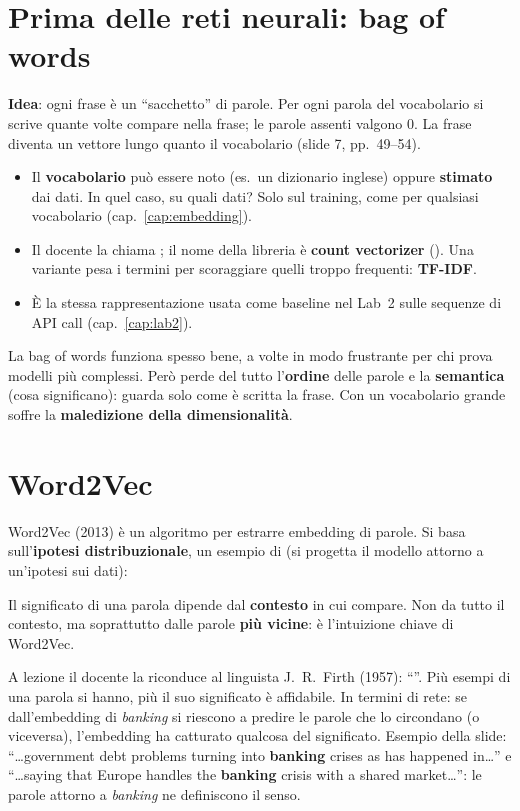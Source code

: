 \section{Prima delle reti neurali: bag of words}
\textbf{Idea}: ogni frase è un ``sacchetto'' di parole. Per ogni parola del vocabolario si scrive quante volte compare nella frase;
le parole assenti valgono 0. La frase diventa un vettore lungo quanto il vocabolario (slide 7, pp.~49--54).
\begin{itemize}
  \item Il \textbf{vocabolario} può essere noto (es.\ un dizionario inglese) oppure \textbf{stimato} dai dati. In quel caso, su quali
        dati? Solo sul training, come per qualsiasi vocabolario (cap.~\ref{cap:embedding}).
  \item Il docente la chiama ; il nome della libreria è \textbf{count vectorizer}
        (). Una variante pesa i termini per scoraggiare quelli troppo frequenti: \textbf{TF-IDF}.
  \item È la stessa rappresentazione usata come baseline nel Lab~2 sulle sequenze di API call (cap.~\ref{cap:lab2}).
\end{itemize}
\begin{attenzione}
La bag of words funziona spesso bene, a volte in modo frustrante per chi prova modelli più complessi. Però perde del tutto
l'\textbf{ordine} delle parole e la \textbf{semantica} (cosa significano): guarda solo come è scritta la frase. Con un vocabolario
grande soffre la \textbf{maledizione della dimensionalità}.
\end{attenzione}

\section{Word2Vec}
Word2Vec (2013) è un algoritmo per estrarre embedding di parole. Si basa sull'\textbf{ipotesi distribuzionale}, un esempio di
 (si progetta il modello attorno a un'ipotesi sui dati):
\begin{definizione}
Il significato di una parola dipende dal \textbf{contesto} in cui compare. Non da tutto il contesto, ma soprattutto dalle parole
\textbf{più vicine}: è l'intuizione chiave di Word2Vec.
\end{definizione}
A lezione il docente la riconduce al linguista J.~R.~Firth (1957): ``''. Più esempi
di una parola si hanno, più il suo significato è affidabile. In termini di rete: se dall'embedding di \emph{banking} si riescono a
predire le parole che lo circondano (o viceversa), l'embedding ha catturato qualcosa del significato.
Esempio della slide: ``\ldots government debt problems turning into \textbf{banking} crises as has happened in\ldots'' e ``\ldots saying
that Europe handles the \textbf{banking} crisis with a shared market\ldots'': le parole attorno a \emph{banking} ne definiscono il senso.

